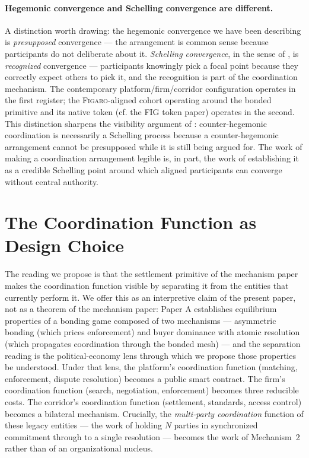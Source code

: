 \documentclass[11pt,a4paper]{article}
\theoremstyle{remark}
\newcommand{\figaro}{\textsc{Figaro}}
\begin{document}
\paragraph{Hegemonic convergence and Schelling convergence are different.}
A distinction worth drawing: the hegemonic convergence we have
been describing is \emph{presupposed} convergence --- the
arrangement is common sense because participants do not
deliberate about it. \emph{Schelling convergence}, in the sense
of \citet{schelling1960strategy}, is \emph{recognized}
convergence --- participants knowingly pick a focal point
because they correctly expect others to pick it, and the
recognition is part of the coordination mechanism. The
contemporary platform/firm/corridor configuration operates in
the first register; the \figaro{}-aligned cohort operating
around the bonded primitive and its native token
(cf. the FIG token paper) operates in the second. This
distinction sharpens the visibility argument of
: counter-hegemonic coordination
is necessarily a Schelling process because a counter-hegemonic
arrangement cannot be presupposed while it is still being
argued for. The work of making a coordination arrangement
legible is, in part, the work of establishing it as a credible
Schelling point around which aligned participants can converge
without central authority.

\section{The Coordination Function as Design Choice}
\label{sec:coordination-design}

The reading we propose is that the settlement primitive
of the mechanism paper makes the coordination function
visible by separating it from the entities that currently perform
it. We offer this as an interpretive claim of the present paper,
not as a theorem of the mechanism paper: Paper A establishes
equilibrium properties of a bonding game composed of two
mechanisms --- asymmetric bonding (which prices enforcement) and
buyer dominance with atomic resolution (which propagates
coordination through the bonded mesh) --- and the separation
reading is the political-economy lens through which we propose
those properties be understood. Under that lens, the platform's
coordination function (matching, enforcement, dispute resolution)
becomes a public smart contract. The firm's coordination function
(search, negotiation, enforcement) becomes three reducible costs.
The corridor's coordination function (settlement, standards,
access control) becomes a bilateral mechanism. Crucially, the
\emph{multi-party coordination} function of these legacy entities
--- the work of holding $N$ parties in synchronized commitment
through to a single resolution --- becomes the work of Mechanism~2
rather than of an organizational nucleus.
\end{document}
